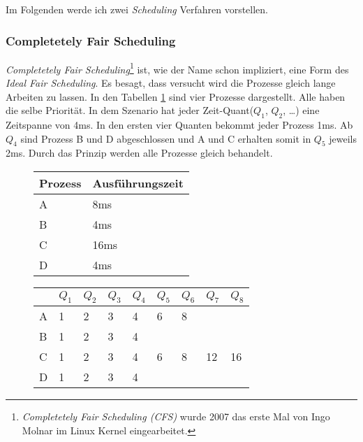 Im Folgenden werde ich zwei \textit{Scheduling} Verfahren vorstellen.
\newpage
\subsubsection{Completetely Fair Scheduling}
\textit{Completetely Fair Scheduling}\footnote{\textit{Completetely Fair Scheduling (CFS)} wurde 2007 das erste Mal von Ingo Molnar im Linux Kernel eingearbeitet.} ist, wie der Name schon impliziert, eine Form des \textit{Ideal Fair Scheduling}. Es besagt, dass versucht wird die Prozesse gleich lange Arbeiten zu lassen. In den Tabellen \ref{Fair Scheduling} sind vier Prozesse dargestellt. Alle haben die selbe Priorität. In dem Szenario hat jeder Zeit-Quant($Q_1$, $Q_2$, \dots) eine Zeitspanne von 4ms. In den ersten vier Quanten bekommt jeder Prozess 1ms. Ab $Q_4$ sind Prozess B und D abgeschlossen und A und C erhalten somit in $Q_5$ jeweils 2ms. Durch das Prinzip werden alle Prozesse gleich behandelt. \cite[Ab 1:35]{CFS:Rebeiro}
\begin{figure}[h]
    \centering
    \begin{tabular}{| l | l |}
        \hline
        Prozess & Ausführungszeit\\
        \hline
        A & 8ms\\
        \hline
        B & 4ms\\
        \hline
        C & 16ms\\
        \hline
        D & 4ms\\
        \hline
    \end{tabular}
    \begin{tabular}{| x{1em} | x{1em} | x{1em} | x{1em} | x{1em} | x{1em} | x{1em} | x{1em} | x{1em} |}
        \hline
        & $Q_1$ & $Q_2$ & $Q_3$ & $Q_4$ & $Q_5$ & $Q_6$ & $Q_7$ & $Q_8$\\
        \hline
        A & 1 & 2 & 3 & 4 & 6 & 8 & &\\
        \hline
        B & 1 & 2 & 3 & 4 & & & &\\
        \hline
        C & 1 & 2 & 3 & 4 & 6 & 8 & 12 & 16\\
        \hline
        D & 1 & 2 & 3 & 4 & & & &\\
        \hline
    \end{tabular}
    \label{Fair Scheduling}
\end{figure}

